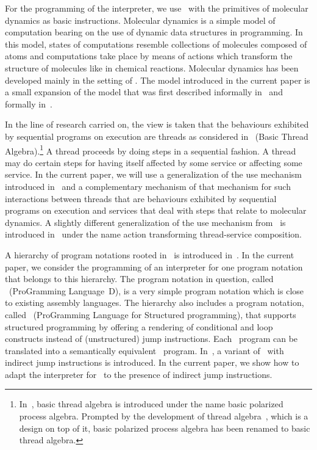 \documentclass[fleqn]{llncs}
\begin{document}
For the programming of the interpreter, we use \PGA\ with the primitives
of molecular dynamics as basic instructions.
Molecular dynamics is a simple model of computation bearing on the use
of dynamic data structures in programming.
In this model, states of computations resemble collections of molecules
composed of atoms and computations take place by means of actions which
transform the structure of molecules like in chemical reactions.
Molecular dynamics has been developed mainly in the setting of \PGA.
The model introduced in the current paper is a small expansion of the
model that was first described informally in~\cite{BB02a} and formally
in~\cite{BM06c}.

In the line of research carried on, the view is taken that the
behaviours exhibited by sequential programs on execution are threads as
considered in \BTA\ (Basic Thread Algebra).\footnote
{In~\cite{BL02a}, basic thread algebra is introduced under the name
 basic polarized process algebra.
 Prompted by the development of thread algebra~\cite{BM04c}, which is a
 design on top of it, basic polarized process algebra has been renamed
 to basic thread algebra.
}
A thread proceeds by doing steps in a sequential fashion.
A thread may do certain steps for having itself affected by some service
or affecting some service.
In the current paper, we will use a generalization of the use mechanism
introduced in~\cite{BM04c} and a complementary mechanism of that
mechanism for such interactions between threads that are behaviours
exhibited by sequential programs on execution and services that deal
with steps that relate to molecular dynamics.
A slightly different generalization of the use mechanism
from~\cite{BM04c} is introduced in~\cite{BM07f} under the name action
transforming thread-service composition.

A hierarchy of program notations rooted in \PGA\ is introduced
in~\cite{BL02a}.
In the current paper, we consider the programming of an interpreter for
one program notation that belongs to this hierarchy.
The program notation in question, called \PGLD\ (ProGramming
Language~D), is a very simple program notation which is close to
existing assembly languages.
The hierarchy also includes a program notation, called \PGLS\
(ProGramming Language for Structured programming), that supports
structured programming by offering a rendering of conditional and loop
constructs instead of (unstructured) jump instructions.
Each \PGLS\ program can be translated into a semantically equivalent
\PGLD\ program.
In~\cite{BM07e}, a variant of \PGLD\ with indirect jump instructions is
introduced.
In the current paper, we show how to adapt the interpreter for \PGLD\ to
the presence of indirect jump instructions.
\end{document}
